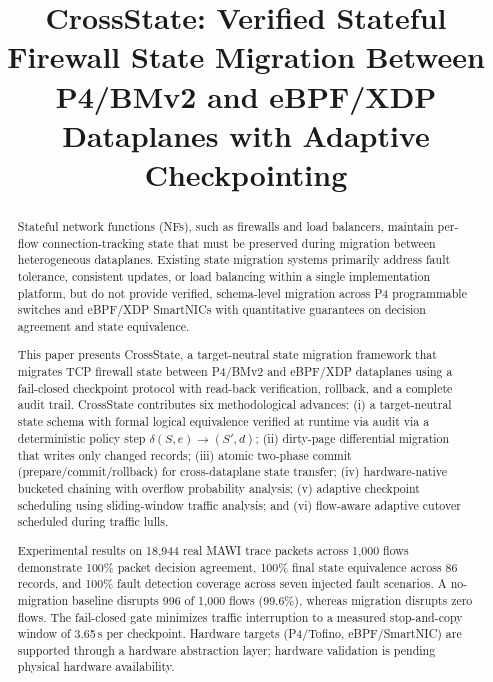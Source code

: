 \documentclass[10pt, conference]{IEEEtran}
\begin{document}
\title{CrossState: Verified Stateful Firewall State Migration Between P4/BMv2 and eBPF/XDP Dataplanes with Adaptive Checkpointing}

\author{
}

\maketitle

\begin{abstract}
Stateful network functions (NFs), such as firewalls and load balancers, maintain per-flow connection-tracking state that must be preserved during migration between heterogeneous dataplanes. Existing state migration systems primarily address fault tolerance, consistent updates, or load balancing within a single implementation platform, but do not provide verified, schema-level migration across P4 programmable switches and eBPF/XDP SmartNICs with quantitative guarantees on decision agreement and state equivalence.

This paper presents CrossState, a target-neutral state migration framework that migrates TCP firewall state between P4/BMv2 and eBPF/XDP dataplanes using a fail-closed checkpoint protocol with read-back verification, rollback, and a complete audit trail. CrossState contributes six methodological advances: (i) a target-neutral state schema with formal logical equivalence verified at runtime via audit via a deterministic policy step $\delta(S,e)\rightarrow(S',d)$; (ii) dirty-page differential migration that writes only changed records; (iii) atomic two-phase commit (prepare/commit/rollback) for cross-dataplane state transfer; (iv) hardware-native bucketed chaining with overflow probability analysis; (v) adaptive checkpoint scheduling using sliding-window traffic analysis; and (vi) flow-aware adaptive cutover scheduled during traffic lulls.

Experimental results on 18{,}944 real MAWI trace packets across 1{,}000 flows demonstrate 100\% packet decision agreement, 100\% final state equivalence across 86 records, and 100\% fault detection coverage across seven injected fault scenarios. A no-migration baseline disrupts 996 of 1{,}000 flows (99.6\%), whereas migration disrupts zero flows. The fail-closed gate minimizes traffic interruption to a measured stop-and-copy window of 3.65\,s per checkpoint. Hardware targets (P4/Tofino, eBPF/SmartNIC) are supported through a hardware abstraction layer; hardware validation is pending physical hardware availability.
\end{abstract}
\end{document}
